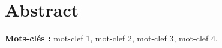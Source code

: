 \section*{Abstract}

\begin{tcolorbox}[colback=gray!20,colframe=gray!20, arc=0mm]
\lipsum[1]

\vspace{0.3cm}
\textbf{Mots-clés :} mot-clef 1, mot-clef 2, mot-clef 3, mot-clef 4.
\end{tcolorbox}
